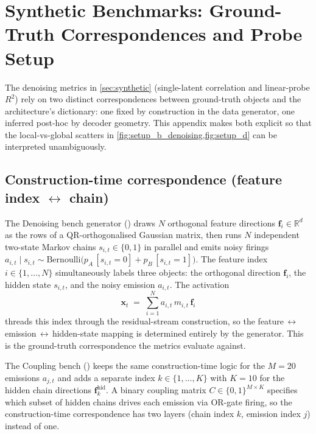 \section{Synthetic Benchmarks: Ground-Truth Correspondences and Probe Setup}
\label{app:synthetic-probes}

The denoising metrics in \cref{sec:synthetic} (single-latent correlation and linear-probe $R^2$) rely on two distinct correspondences between ground-truth objects and the architecture's dictionary: one fixed by construction in the data generator, one inferred post-hoc by decoder geometry. This appendix makes both explicit so that the local-vs-global scatters in \cref{fig:setup_b_denoising,fig:setup_d} can be interpreted unambiguously.

\subsection{Construction-time correspondence (feature index $\leftrightarrow$ chain)}
\label{app:synthetic-construction}

The Denoising bench generator () draws $N$ orthogonal feature directions $\mathbf{f}_i \in \mathbb{R}^d$ as the rows of a QR-orthogonalised Gaussian matrix, then runs $N$ independent two-state Markov chains $s_{i,t} \in \{0,1\}$ in parallel and emits noisy firings $a_{i,t}\mid s_{i,t}\sim\mathrm{Bernoulli}\!\big(p_A\,[s_{i,t}{=}0] + p_B\,[s_{i,t}{=}1]\big)$. The feature index $i \in \{1,\ldots,N\}$ simultaneously labels three objects: the orthogonal direction $\mathbf{f}_i$, the hidden state $s_{i,t}$, and the noisy emission $a_{i,t}$. The activation
\[
    \mathbf{x}_t \;=\; \sum_{i=1}^N a_{i,t}\, m_{i,t}\, \mathbf{f}_i
\]
threads this index through the residual-stream construction, so the feature$\,\leftrightarrow\,$emission$\,\leftrightarrow\,$hidden-state mapping is determined entirely by the generator. This is the ground-truth correspondence the metrics evaluate against.

The Coupling bench () keeps the same construction-time logic for the $M = 20$ emissions $a_{j,t}$ and adds a separate index $k \in \{1,\ldots,K\}$ with $K = 10$ for the hidden chain directions $\mathbf{f}^{\mathrm{hid}}_k$. A binary coupling matrix $C \in \{0,1\}^{M \times K}$ specifies which subset of hidden chains drives each emission via OR-gate firing, so the construction-time correspondence has two layers (chain index $k$, emission index $j$) instead of one.

